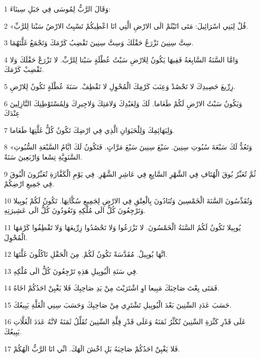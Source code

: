 \par 1 وَقَالَ الرَّبُّ لِمُوسَى فِي جَبَلِ سِينَاءَ:
\par 2 «قُلْ لِبَنِي اسْرَائِيلَ: مَتَى اتَيْتُمْ الَى الارْضِ الَّتِي انَا اعْطِيكُمْ تَسْبِتُ الارْضُ سَبْتا لِلرَّبِّ.
\par 3 سِتَّ سِنِينَ تَزْرَعُ حَقْلَكَ وَسِتَّ سِنِينَ تَقْضِبُ كَرْمَكَ وَتَجْمَعُ غَلَّتَهُمَا.
\par 4 وَامَّا السَّنَةُ السَّابِعَةُ فَفِيهَا يَكُونُ لِلارْضِ سَبْتُ عُطْلَةٍ سَبْتا لِلرَّبِّ. لا تَزْرَعْ حَقْلَكَ وَلا تَقْضِبْ كَرْمَكَ.
\par 5 زِرِّيعَ حَصِيدِكَ لا تَحْصُدْ وَعِنَبَ كَرْمِكَ الْمُحْوِلِ لا تَقْطِفْ. سَنَةَ عُطْلَةٍ تَكُونُ لِلارْضِ.
\par 6 وَيَكُونُ سَبْتُ الارْضِ لَكُمْ طَعَاما. لَكَ وَلِعَبْدِكَ وَلامَتِكَ وَلاجِيرِكَ وَلِمُسْتَوْطِنِكَ النَّازِلِينَ عِنْدَكَ
\par 7 وَلِبَهَائِمِكَ وَلِلْحَيَوَانِ الَّذِي فِي ارْضِكَ تَكُونُ كُلُّ غَلَّتِهَا طَعَاما.
\par 8 «وَتَعُدُّ لَكَ سَبْعَةَ سُبُوتِ سِنِينَ. سَبْعَ سِنِينَ سَبْعَ مَرَّاتٍ. فَتَكُونُ لَكَ ايَّامُ السَّبْعَةِ السُّبُوتِ السَّنَوِيَّةِ تِسْعا وَارْبَعِينَ سَنَةً.
\par 9 ثُمَّ تُعَبِّرُ بُوقَ الْهُتَافِ فِي الشَّهْرِ السَّابِعِ فِي عَاشِرِ الشَّهْرِ. فِي يَوْمِ الْكَفَّارَةِ تُعَبِّرُونَ الْبُوقَ فِي جَمِيعِ ارْضِكُمْ.
\par 10 وَتُقَدِّسُونَ السَّنَةَ الْخَمْسِينَ وَتُنَادُونَ بِالْعِتْقِ فِي الارْضِ لِجَمِيعِ سُكَّانِهَا. تَكُونُ لَكُمْ يُوبِيلا وَتَرْجِعُونَ كُلٌّ الَى مُلْكِهِ وَتَعُودُونَ كُلٌّ الَى عَشِيرَتِهِ.
\par 11 يُوبِيلا تَكُونُ لَكُمُ السَّنَةُ الْخَمْسُونَ. لا تَزْرَعُوا وَلا تَحْصُدُوا زِرِّيعَهَا وَلا تَقْطِفُوا كَرْمَهَا الْمُحْوِلَ.
\par 12 انَّهَا يُوبِيلٌ. مُقَدَّسَةً تَكُونُ لَكُمْ. مِنَ الْحَقْلِ تَاكُلُونَ غَلَّتَهَا.
\par 13 فِي سَنَةِ الْيُوبِيلِ هَذِهِ تَرْجِعُونَ كُلٌّ الَى مُلْكِهِ.
\par 14 فَمَتَى بِعْتَ صَاحِبَكَ مَبِيعا اوِ اشْتَرَيْتَ مِنْ يَدِ صَاحِبِكَ فَلا يَغْبِنْ احَدُكُمْ اخَاهُ.
\par 15 حَسَبَ عَدَدِ السِّنِينَ بَعْدَ الْيُوبِيلِ تَشْتَرِي مِنْ صَاحِبِكَ وَحَسَبَ سِنِي الْغَلَّةِ يَبِيعُكَ.
\par 16 عَلَى قَدْرِ كَثْرَةِ السِّنِينَ تُكَثِّرُ ثَمَنَهُ وَعَلَى قَدْرِ قِلَّةِ السِّنِينَ تُقَلِّلُ ثَمَنَهُ لانَّهُ عَدَدَ الْغَلَّاتِ يَبِيعُكَ.
\par 17 فَلا يَغْبِنْ احَدُكُمْ صَاحِبَهُ بَلِ اخْشَ الَهَكَ. انِّي انَا الرَّبُّ الَهُكُمْ.
